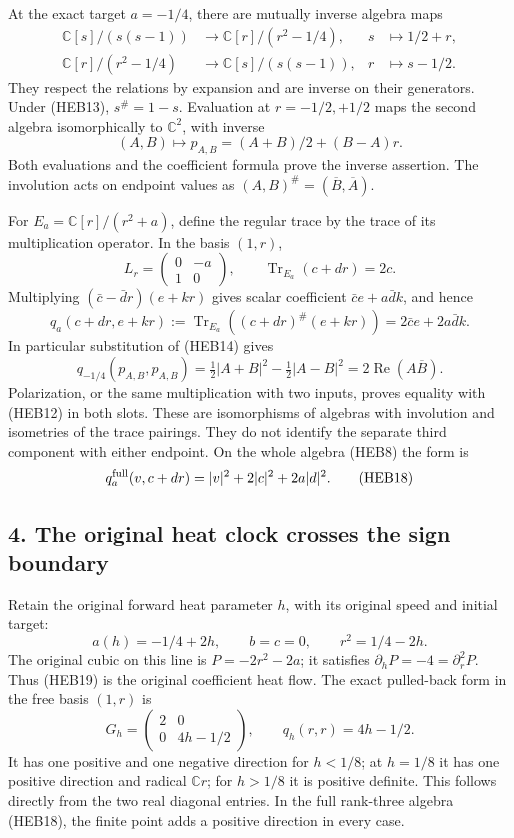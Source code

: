 \documentclass[
  10pt,
  a4paper,
]{article}
\begin{document}
At the exact target \(a=-1/4\), there are mutually inverse algebra maps
\[
\begin{aligned}
\mathbb C[s]/(s(s-1))&\longrightarrow
\mathbb C[r]/(r^2-1/4),&s&\longmapsto1/2+r,\\
\mathbb C[r]/(r^2-1/4)&\longrightarrow
\mathbb C[s]/(s(s-1)),&r&\longmapsto s-1/2.
\end{aligned}\tag{HEB13}
\] They respect the relations by expansion and are inverse on their
generators. Under (HEB13), \(s^\#=1-s\). Evaluation at \(r=-1/2,+1/2\)
maps the second algebra isomorphically to \(\mathbb C^2\), with inverse
\[
(A,B)\longmapsto p_{A,B}=(A+B)/2+(B-A)r.
\tag{HEB14}
\] Both evaluations and the coefficient formula prove the inverse
assertion. The involution acts on endpoint values as
\((A,B)^\#=(\overline B,\overline A)\).

For \(E_a=\mathbb C[r]/(r^2+a)\), define the regular trace by the trace
of its multiplication operator. In the basis \((1,r)\), \[
L_r=\begin{pmatrix}0&-a\\1&0\end{pmatrix},\qquad
\operatorname{Tr}_{E_a}(c+dr)=2c.
\tag{HEB15}
\] Multiplying \((\bar c-\bar d r)(e+kr)\) gives scalar coefficient
\(\bar ce+a\bar dk\), and hence \[
q_a(c+dr,e+kr):=\operatorname{Tr}_{E_a}((c+dr)^\#(e+kr))
=2\bar ce+2a\bar dk.
\tag{HEB16}
\] In particular substitution of (HEB14) gives \[
q_{-1/4}(p_{A,B},p_{A,B})
=\tfrac12|A+B|^2-\tfrac12|A-B|^2
=2\operatorname{Re}(A\overline B).
\tag{HEB17}
\] Polarization, or the same multiplication with two inputs, proves
equality with (HEB12) in both slots. These are isomorphisms of algebras
with involution and isometries of the trace pairings. They do not
identify the separate third component with either endpoint. On the whole
algebra (HEB8) the form is \[
q^{\rm full}_a(v,c+dr)=|v|^2+2|c|^2+2a|d|^2.
\tag{HEB18}
\]

\subsection{4. The original heat clock crosses the sign
boundary}\label{the-original-heat-clock-crosses-the-sign-boundary}

Retain the original forward heat parameter \(h\), with its original
speed and initial target: \[
a(h)=-1/4+2h,\qquad b=c=0,\qquad
r^2=1/4-2h.
\tag{HEB19}
\] The original cubic on this line is \(P=-2r^2-2a\); it satisfies
\(\partial_hP=-4=\partial_r^2P\). Thus (HEB19) is the original
coefficient heat flow. The exact pulled-back form in the free basis
\((1,r)\) is \[
G_h=\begin{pmatrix}2&0\\0&4h-1/2\end{pmatrix},
\qquad q_h(r,r)=4h-1/2.
\tag{HEB20}
\] It has one positive and one negative direction for \(h<1/8\); at
\(h=1/8\) it has one positive direction and radical \(\mathbb C r\); for
\(h>1/8\) it is positive definite. This follows directly from the two
real diagonal entries. In the full rank-three algebra (HEB18), the
finite point adds a positive direction in every case.
\end{document}
